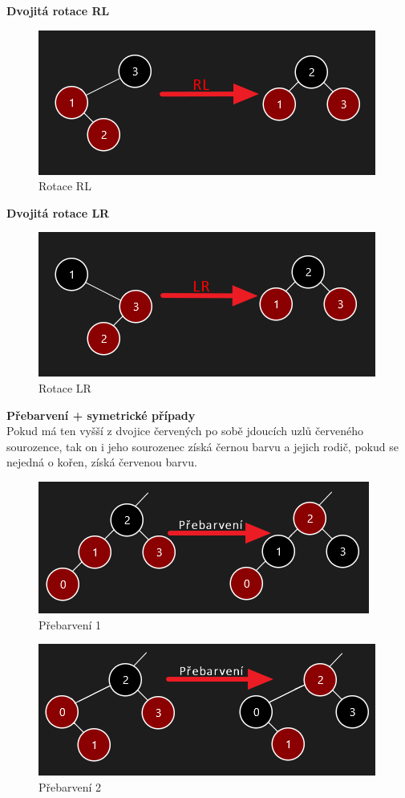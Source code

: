 \documentclass[
  biblatex=false,
  font=serif,
  glossaries=false,
  tables=false,
  theorems=false,
  index
]{kidiplom}
\begin{document}
\newpage
\noindent\textbf{Dvojitá rotace RL}
\begin{figure}[h!]
\centering
	\includegraphics[scale=0.8]{obrazky/20RL.png}
	\caption{Rotace RL}
\end{figure}

\noindent\textbf{Dvojitá rotace LR}
\begin{figure}[h!]
\centering
	\includegraphics[scale=0.8]{obrazky/21LR.png}
	\caption{Rotace LR}
\end{figure}

\noindent\textbf{Přebarvení + symetrické případy}\\
Pokud má ten vyšší z dvojice červených po sobě jdoucích uzlů červeného sourozence, tak on i jeho sourozenec získá černou barvu a jejich rodič, pokud se nejedná o kořen, získá červenou barvu.\\
\begin{figure}[h!]
\centering
	\includegraphics[scale=0.8]{obrazky/22Prebarveni.png}
	\caption{Přebarvení 1}
\end{figure}

\begin{figure}[h!]
\centering
	\includegraphics[scale=0.8]{obrazky/23Prebarveni.png}
	\caption{Přebarvení 2}
\end{figure}
\newpage
\end{document}
